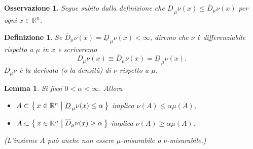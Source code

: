 \documentclass[a4paper,10pt,openright,oneside]{book}
\theoremstyle{theoremstyle}
\newtheorem{lemma}[teorema]{Lemma}
\theoremstyle{theoremstylewoheader}
\theoremstyle{theoremstyle}
\newtheorem{definizione}[teorema]{Definizione}
\newtheorem{osservazione}[teorema]{Osservazione}
\theoremstyle{proofsecstyle}
\theoremstyle{nonumberplain}
\newcommand{\RR}{\ensuremath{\mathbb{R}}}
\newcommand{\lDer}[2]{\ensuremath{\underline{D}_{\,#2} #1}}
\newcommand{\uDer}[2]{\ensuremath{\overline{D}_#2 #1}}
\newcommand{\Der}[2]{\ensuremath{D_#2 #1}}
\begin{document}
\begin{osservazione}
Segue subito dalla definizione che $\lDer{\nu}{\mu}(x) \le \uDer{\nu}{\mu}(x)$ per ogni $x \in \RR^n$.
\end{osservazione}

\begin{definizione}
\label{def:derivata_di_una_misura}
Se $\uDer{\nu}{\mu}(x) = \lDer{\nu}{\mu}(x) < \infty$, diremo che $\nu$ è \emph{differenziabile} rispetto a $\mu$ in $x$ e scriveremo
\[
\Der{\nu}{\mu} (x) \equiv \uDer{\nu}{\mu}(x) = \lDer{\nu}{\mu}(x).
\]
$\Der{\nu}{\mu}$ è la \emph{derivata} (o la \emph{densità}) di $\nu$ rispetto a $\mu$.
\end{definizione}

\begin{lemma}
\label{lem:derivate}
Si fissi $0 < \alpha < \infty$. Allora
\begin{itemize}
\item[(i)] $ A \subset \Set{ x \in \RR^n | \lDer{\nu}{\mu} (x) \le \alpha }$ implica $\nu(A) \le \alpha\mu(A)$,
\item[(ii)] $ A \subset \Set{ x \in \RR^n | \uDer{\nu}{\mu} (x) \ge \alpha }$ implica $\nu(A) \ge \alpha\mu(A)$.
\end{itemize}
(L'insieme $A$ può anche non essere $\mu$-misurabile o $\nu$-misurabile.)
\end{lemma}
\end{document}
